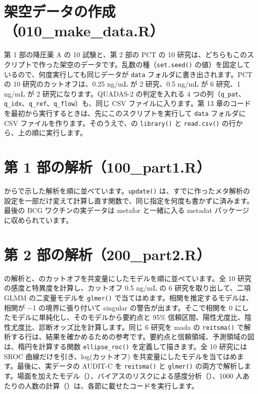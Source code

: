 \section{架空データの作成（010\_make\_data.R）}
\label{sec:A-6}

第 1 部の降圧薬 A の 10 試験と、第 2 部の PCT の 10 研究は、どちらもこのスクリプトで作った架空のデータです。乱数の種（\texttt{set.seed()} の値）を固定しているので、何度実行しても同じデータが \texttt{data} フォルダに書き出されます。PCT の 10 研究のカットオフは、0.25 ng/mL が 2 研究、0.5 ng/mL が 6 研究、1 ng/mL が 2 研究になります。QUADAS-2 の判定を入れる 4 つの列（\texttt{q\_pat}、\texttt{q\_idx}、\texttt{q\_ref}、\texttt{q\_flow}）も、同じ CSV ファイルに入ります。第 13 章のコードを最初から実行するときは、先にこのスクリプトを実行して \texttt{data} フォルダに CSV ファイルを作ります。そのうえで、の \texttt{library()} と \texttt{read.csv()} の行から、上の順に実行します。


\section{第 1 部の解析（100\_part1.R）}
\label{sec:A-7}

からで示した解析を順に並べています。\texttt{update()} は、すでに作ったメタ解析の設定を一部だけ変えて計算し直す関数で、同じ指定を何度も書かずに済みます。最後の BCG ワクチンの実データは metafor と一緒に入る metadat パッケージに収められています。


\section{第 2 部の解析（200\_part2.R）}
\label{sec:A-8}

の解析と、のカットオフを共変量にしたモデルを順に並べています。全 10 研究の感度と特異度を計算し、カットオフ 0.5 ng/mL の 6 研究を取り出して、二項 GLMM の二変量モデルを \texttt{glmer()} で当てはめます。相関を推定するモデルは、相関が −1 の境界に張り付いて singular の警告が出ます。そこで相関を 0 にしたモデルに単純化し、そのモデルから要約点と 95\% 信頼区間、陽性尤度比、陰性尤度比、診断オッズ比を計算します。同じ 6 研究を mada の \texttt{reitsma()} で解析する行は、結果を確かめるための参考です。要約点と信頼領域、予測領域の図は、楕円を計算する関数 \texttt{ellipse\_roc()} を定義して描きます。全 10 研究には SROC 曲線だけを引き、log(カットオフ) を共変量にしたモデルを当てはめます。最後に、実データの AUDIT-C を \texttt{reitsma()} と \texttt{glmer()} の両方で解析します。場面を加えたモデル（）、バイアスのリスクによる感度分析（）、1000 人あたりの人数の計算（）は、各節に載せたコードを実行します。

